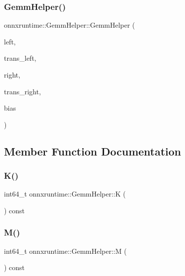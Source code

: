 \subsubsection{\texorpdfstring{Gemm\+Helper()}{GemmHelper()}}
{\footnotesize\ttfamily onnxruntime\+::\+Gemm\+Helper\+::\+Gemm\+Helper (\begin{DoxyParamCaption}\item[{const \mbox{\hyperlink{classonnxruntime_1_1TensorShape}{Tensor\+Shape}} \&}]{left,  }\item[{bool}]{trans\+\_\+left,  }\item[{const \mbox{\hyperlink{classonnxruntime_1_1TensorShape}{Tensor\+Shape}} \&}]{right,  }\item[{bool}]{trans\+\_\+right,  }\item[{const \mbox{\hyperlink{classonnxruntime_1_1TensorShape}{Tensor\+Shape}} \&}]{bias }\end{DoxyParamCaption})\hspace{0.3cm}{\ttfamily [inline]}}



\subsection{Member Function Documentation}
\mbox{\label{classonnxruntime_1_1GemmHelper_aa53f075f2978dd1ffcd6780637f5a493}} 
\subsubsection{\texorpdfstring{K()}{K()}}
{\footnotesize\ttfamily int64\+\_\+t onnxruntime\+::\+Gemm\+Helper\+::K (\begin{DoxyParamCaption}{ }\end{DoxyParamCaption}) const\hspace{0.3cm}{\ttfamily [inline]}}

\mbox{\label{classonnxruntime_1_1GemmHelper_a4c263b6e85ef1b5bf407d40130deeb95}} 
\subsubsection{\texorpdfstring{M()}{M()}}
{\footnotesize\ttfamily int64\+\_\+t onnxruntime\+::\+Gemm\+Helper\+::M (\begin{DoxyParamCaption}{ }\end{DoxyParamCaption}) const\hspace{0.3cm}{\ttfamily [inline]}}

